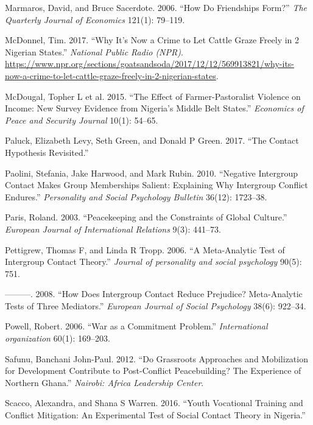 \documentclass[11pt]{article}
\begin{document}
\hypertarget{ref-marmaros2006friendships}{}
Marmaros, David, and Bruce Sacerdote. 2006. ``How Do Friendships Form?''
\emph{The Quarterly Journal of Economics} 121(1): 79--119.

\hypertarget{ref-mcdonnel2017graze}{}
McDonnel, Tim. 2017. ``Why It's Now a Crime to Let Cattle Graze Freely
in 2 Nigerian States.'' \emph{National Public Radio (NPR)}.
\url{https://www.npr.org/sections/goatsandsoda/2017/12/12/569913821/why-its-now-a-crime-to-let-cattle-graze-freely-in-2-nigerian-states}.

\hypertarget{ref-mcdougal2015effect}{}
McDougal, Topher L et al. 2015. ``The Effect of Farmer-Pastoralist
Violence on Income: New Survey Evidence from Nigeria's Middle Belt
States.'' \emph{Economics of Peace and Security Journal} 10(1): 54--65.

\hypertarget{ref-paluck2017contact}{}
Paluck, Elizabeth Levy, Seth Green, and Donald P Green. 2017. ``The
Contact Hypothesis Revisited.''

\hypertarget{ref-paolini2010negative}{}
Paolini, Stefania, Jake Harwood, and Mark Rubin. 2010. ``Negative
Intergroup Contact Makes Group Memberships Salient: Explaining Why
Intergroup Conflict Endures.'' \emph{Personality and Social Psychology
Bulletin} 36(12): 1723--38.

\hypertarget{ref-paris2003peacekeeping}{}
Paris, Roland. 2003. ``Peacekeeping and the Constraints of Global
Culture.'' \emph{European Journal of International Relations} 9(3):
441--73.

\hypertarget{ref-pettigrew2006meta}{}
Pettigrew, Thomas F, and Linda R Tropp. 2006. ``A Meta-Analytic Test of
Intergroup Contact Theory.'' \emph{Journal of personality and social
psychology} 90(5): 751.

\hypertarget{ref-pettigrew2008does}{}
---------. 2008. ``How Does Intergroup Contact Reduce Prejudice?
Meta-Analytic Tests of Three Mediators.'' \emph{European Journal of
Social Psychology} 38(6): 922--34.

\hypertarget{ref-powell2006war}{}
Powell, Robert. 2006. ``War as a Commitment Problem.''
\emph{International organization} 60(1): 169--203.

\hypertarget{ref-safunu2012grassroots}{}
Safunu, Banchani John-Paul. 2012. ``Do Grassroots Approaches and
Mobilization for Development Contribute to Post-Conflict Peacebuilding?
The Experience of Northern Ghana.'' \emph{Nairobi: Africa Leadership
Center}.

\hypertarget{ref-Scacco2016}{}
Scacco, Alexandra, and Shana S Warren. 2016. ``Youth Vocational Training
and Conflict Mitigation: An Experimental Test of Social Contact Theory
in Nigeria.''
\end{document}
